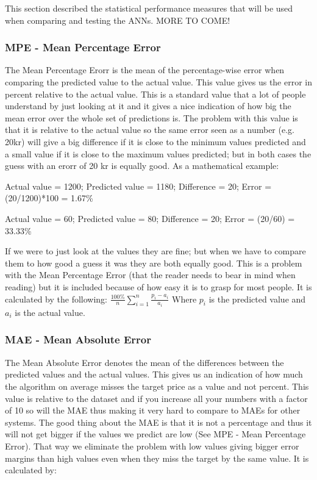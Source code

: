 This section described the statistical performance measures that will be used when comparing and testing the ANNs. MORE TO COME!

\subsubsection{MPE - Mean Percentage Error}
The Mean Percentage Erorr is the mean of the percentage-wise error when comparing the predicted value to the actual value. This value gives us the error in percent relative to the actual value. This is a standard value that a lot of people understand by just looking at it and it gives a nice indication of how big the mean error over the whole set of predictions is. The problem with this value is that it is relative to the actual value so the same error seen as a number (e.g. 20kr) will give a big difference if it is close to the minimum values predicted and a small value if it is close to the maximum values predicted; but in both cases the guess with an erorr of 20 kr is equally good. As a mathematical example:

Actual value = 1200; Predicted value = 1180; Difference = 20; Error = (20/1200)*100 = 1.67\% 

Actual value = 60; Predicted value = 80; Difference = 20; Error = (20/60) = 33.33\%

If we were to just look at the values they are fine; but when we have to compare them to how good a guess it was they are both equally good. This is a problem with the Mean Percentage Error (that the reader needs to bear in mind when reading) but it is included because of how easy it is to grasp for most people.
It is calculated by the following:
$ \frac{100\%}{n}\sum_{i=1}^{n}\frac{p_i - a_i}{a_i} $
Where $p_i$ is the predicted value and $a_i$ is the actual value.
\subsubsection{MAE - Mean Absolute Error}
The Mean Absolute Error denotes the mean of the differences between the predicted values and the actual values. This gives us an indication of how much the algorithm on average misses the target price as a value and not percent. This value is relative to the dataset and if you increase all your numbers with a factor of 10 so will the MAE thus making it very hard to compare to MAEs for other systems. The good thing about the MAE is that it is not a percentage and thus it will not get bigger if the values we predict are low (See MPE - Mean Percentage Error). That way we eliminate the problem with low values giving bigger error margins than high values even when they miss the target by the same value. It is calculated by:

